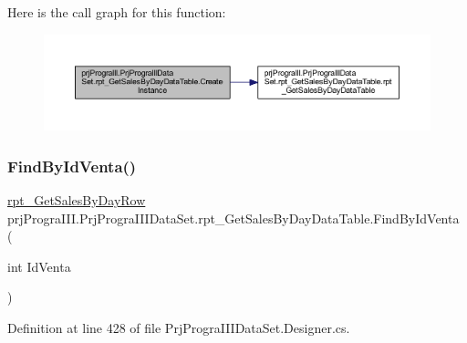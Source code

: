 Here is the call graph for this function\+:
\nopagebreak
\begin{figure}[H]
\begin{center}
\leavevmode
\includegraphics[width=350pt]{classprj_progra_i_i_i_1_1_prj_progra_i_i_i_data_set_1_1rpt___get_sales_by_day_data_table_a6c1dc206c680402843dbbe9744a240ed_cgraph}
\end{center}
\end{figure}
\hypertarget{classprj_progra_i_i_i_1_1_prj_progra_i_i_i_data_set_1_1rpt___get_sales_by_day_data_table_adecc48223b37235d3837b7f0c895d033}{}\label{classprj_progra_i_i_i_1_1_prj_progra_i_i_i_data_set_1_1rpt___get_sales_by_day_data_table_adecc48223b37235d3837b7f0c895d033} 
\subsubsection{\texorpdfstring{Find\+By\+Id\+Venta()}{FindByIdVenta()}}
{\footnotesize\ttfamily \hyperlink{classprj_progra_i_i_i_1_1_prj_progra_i_i_i_data_set_1_1rpt___get_sales_by_day_row}{rpt\+\_\+\+Get\+Sales\+By\+Day\+Row} prj\+Progra\+I\+I\+I.\+Prj\+Progra\+I\+I\+I\+Data\+Set.\+rpt\+\_\+\+Get\+Sales\+By\+Day\+Data\+Table.\+Find\+By\+Id\+Venta (\begin{DoxyParamCaption}\item[{int}]{Id\+Venta }\end{DoxyParamCaption})}



Definition at line 428 of file Prj\+Progra\+I\+I\+I\+Data\+Set.\+Designer.\+cs.

\hypertarget{classprj_progra_i_i_i_1_1_prj_progra_i_i_i_data_set_1_1rpt___get_sales_by_day_data_table_a1d93f2fc1d404a0b58348171b5a8b19e}{}\label{classprj_progra_i_i_i_1_1_prj_progra_i_i_i_data_set_1_1rpt___get_sales_by_day_data_table_a1d93f2fc1d404a0b58348171b5a8b19e} 
